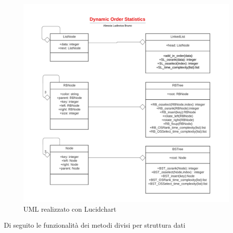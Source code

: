 \begin{figure}[H]
    \centering
     \includegraphics[width=1\textwidth]{Images/UML.png}
    \caption{UML realizzato con Lucidchart}
\end{figure}
Di seguito le funzionalità dei metodi divisi per struttura dati

